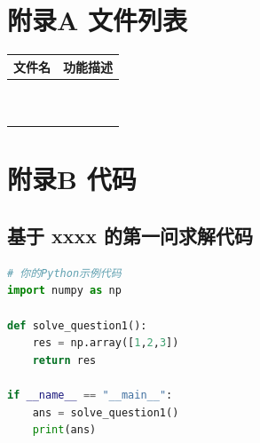 \section*{附录A 文件列表}
\begin{table}[H] %
\centering %
\begin{tabular}{|c|c|} %
\hline %
文件名 & 功能描述 \\ \hline
 &  \\ \hline
 &  \\ \hline
 &  \\ \hline
 &  \\ \hline
 &  \\ \hline
 &  \\ \hline
 &  \\ \hline
 &  \\ \hline
 &  \\ \hline
 &  \\ \hline
\end{tabular}
\end{table}


\section*{附录B 代码}

\subsection*{基于 xxxx 的第一问求解代码}
\begin{lstlisting}[language=Python]
# 你的Python示例代码
import numpy as np

def solve_question1():
    res = np.array([1,2,3])
    return res

if __name__ == "__main__":
    ans = solve_question1()
    print(ans)
\end{lstlisting}



